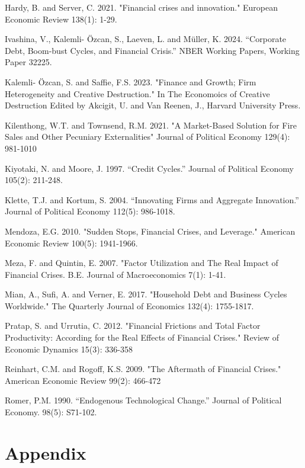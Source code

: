 \documentclass[a4paper,12pt]{article}
\begin{document}
\begin{thebibliography}{9}
    \item Hardy, B. and Server, C. 2021. "Financial crises and innovation." European Economic Review 138(1): 1-29.
    \item Ivashina, V., Kalemli- Özcan, S., Laeven, L. and Müller, K. 2024. “Corporate Debt, Boom-bust Cycles, and Financial Crisis.” NBER Working Papers, Working Paper 32225.
    \item Kalemli- Özcan, S. and Saffie, F.S. 2023. "Finance and Growth; Firm Heterogeneity and Creative Destruction." In The Economoics of Creative Destruction Edited by Akcigit, U. and Van Reenen, J., Harvard University Press.
    \item Kilenthong, W.T. and Townsend, R.M. 2021. "A Market-Based Solution for Fire Sales and Other Pecuniary Externalities" Journal of Political Economy 129(4): 981-1010
    \item Kiyotaki, N. and Moore, J. 1997. “Credit Cycles.” Journal of Political Economy 105(2): 211-248.
    \item Klette, T.J. and Kortum, S. 2004. “Innovating Firms and Aggregate Innovation.” Journal of Political Economy 112(5): 986-1018.
    \item Mendoza, E.G. 2010. "Sudden Stops, Financial Crises, and Leverage." American Economic Review 100(5): 1941-1966.
    \item Meza, F. and Quintin, E. 2007. "Factor Utilization and The Real Impact of Financial Crises. B.E. Journal of Macroeconomics 7(1): 1-41.
    \item Mian, A., Sufi, A. and Verner, E. 2017. "Household Debt and Business Cycles Worldwide." The Quarterly Journal of Economics 132(4): 1755-1817.
    \item Pratap, S. and Urrutia, C. 2012. "Financial Frictions and Total Factor Productivity: According for the Real Effects of Financial Crises." Review of Economic Dynamics 15(3): 336-358
    \item Reinhart, C.M. and Rogoff, K.S. 2009. "The Aftermath of Financial Crises." American Economic Review 99(2): 466-472
    \item Romer, P.M. 1990. “Endogenous Technological Change.” Journal of Political Economy. 98(5): S71-102.
\end{thebibliography}

\clearpage
\section*{Appendix}
\end{document}
